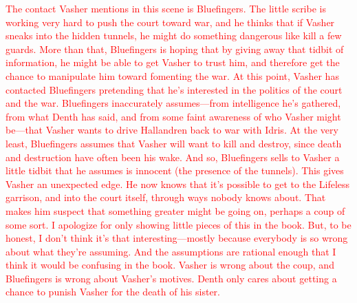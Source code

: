 \textcolor{red}{
The contact Vasher mentions in this scene is Bluefingers. The little scribe is working very hard to push the court toward war, and he thinks that if Vasher sneaks into the hidden tunnels, he might do something dangerous like kill a few guards. More than that, Bluefingers is hoping that by giving away that tidbit of information, he might be able to get Vasher to trust him, and therefore get the chance to manipulate him toward fomenting the war.
}
\textcolor{red}{
At this point, Vasher has contacted Bluefingers pretending that he’s interested in the politics of the court and the war. Bluefingers inaccurately assumes—from intelligence he’s gathered, from what Denth has said, and from some faint awareness of who Vasher might be—that Vasher wants to drive Hallandren back to war with Idris. At the very least, Bluefingers assumes that Vasher will want to kill and destroy, since death and destruction have often been his wake.
}
\textcolor{red}{
And so, Bluefingers sells to Vasher a little tidbit that he assumes is innocent (the presence of the tunnels). This gives Vasher an unexpected edge. He now knows that it’s possible to get to the Lifeless garrison, and into the court itself, through ways nobody knows about. That makes him suspect that something greater might be going on, perhaps a coup of some sort.
}
\textcolor{red}{
I apologize for only showing little pieces of this in the book. But, to be honest, I don’t think it’s that interesting—mostly because everybody is so wrong about what they’re assuming. And the assumptions are rational enough that I think it would be confusing in the book. Vasher is wrong about the coup, and Bluefingers is wrong about Vasher’s motives. Denth only cares about getting a chance to punish Vasher for the death of his sister.
}



